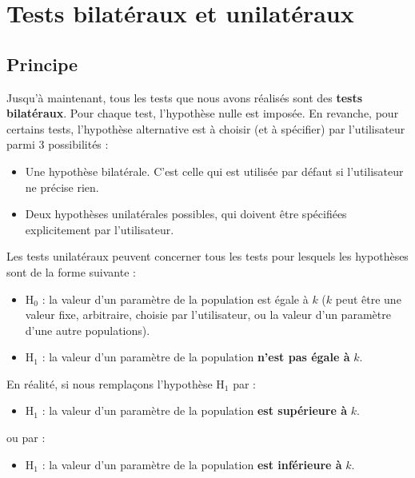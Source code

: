 \documentclass[
  french,
  a4paper,
  DIV=11,
  numbers=noendperiod,
  oneside]{scrreprt}
\providecommand{\tightlist}{%
  \setlength{\itemsep}{0pt}\setlength{\parskip}{0pt}}
\begin{document}
\section{Tests bilatéraux et unilatéraux}\label{sec-bilat}

\subsection{Principe}\label{principe}

Jusqu'à maintenant, tous les tests que nous avons réalisés sont des
\textbf{tests bilatéraux}. Pour chaque test, l'hypothèse nulle est
imposée. En revanche, pour certains tests, l'hypothèse alternative est à
choisir (et à spécifier) par l'utilisateur parmi 3 possibilités :

\begin{itemize}
\tightlist
\item
  Une hypothèse bilatérale. C'est celle qui est utilisée par défaut si
  l'utilisateur ne précise rien.
\item
  Deux hypothèses unilatérales possibles, qui doivent être spécifiées
  explicitement par l'utilisateur.
\end{itemize}

Les tests unilatéraux peuvent concerner tous les tests pour lesquels les
hypothèses sont de la forme suivante :

\begin{itemize}
\tightlist
\item
  H\(_0\) : la valeur d'un paramètre de la population est égale à \(k\)
  (\(k\) peut être une valeur fixe, arbitraire, choisie par
  l'utilisateur, ou la valeur d'un paramètre d'une autre populations).
\item
  H\(_1\) : la valeur d'un paramètre de la population \textbf{n'est pas
  égale à} \(k\).
\end{itemize}

En réalité, si nous remplaçons l'hypothèse H\(_1\) par :

\begin{itemize}
\tightlist
\item
  H\(_1\) : la valeur d'un paramètre de la population \textbf{est
  supérieure à} \(k\).
\end{itemize}

ou par :

\begin{itemize}
\tightlist
\item
  H\(_1\) : la valeur d'un paramètre de la population \textbf{est
  inférieure à} \(k\).
\end{itemize}
\end{document}
